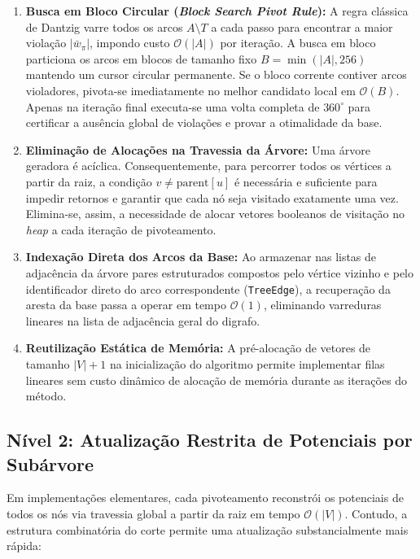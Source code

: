 \begin{enumerate}
    \item \textbf{Busca em Bloco Circular (\textit{Block Search Pivot Rule}):} A regra clássica de Dantzig varre todos os arcos $A \setminus T$ a cada passo para encontrar a maior violação $|\bar{w}_\pi|$, impondo custo $\mathcal{O}(|A|)$ por iteração. A busca em bloco particiona os arcos em blocos de tamanho fixo $B = \min(|A|, 256)$ mantendo um cursor circular permanente. Se o bloco corrente contiver arcos violadores, pivota-se imediatamente no melhor candidato local em $\mathcal{O}(B)$. Apenas na iteração final executa-se uma volta completa de $360^\circ$ para certificar a ausência global de violações e provar a otimalidade da base.
    \item \textbf{Eliminação de Alocações na Travessia da Árvore:} Uma árvore geradora é acíclica. Consequentemente, para percorrer todos os vértices a partir da raiz, a condição $v \ne \text{parent}[u]$ é necessária e suficiente para impedir retornos e garantir que cada nó seja visitado exatamente uma vez. Elimina-se, assim, a necessidade de alocar vetores booleanos de visitação no \textit{heap} a cada iteração de pivoteamento.
    \item \textbf{Indexação Direta dos Arcos da Base:} Ao armazenar nas listas de adjacência da árvore pares estruturados compostos pelo vértice vizinho e pelo identificador direto do arco correspondente (\lstinline{TreeEdge}), a recuperação da aresta da base passa a operar em tempo $\mathcal{O}(1)$, eliminando varreduras lineares na lista de adjacência geral do digrafo.
    \item \textbf{Reutilização Estática de Memória:} A pré-alocação de vetores de tamanho $|V|+1$ na inicialização do algoritmo permite implementar filas lineares sem custo dinâmico de alocação de memória durante as iterações do método.
\end{enumerate}

\subsection{Nível 2: Atualização Restrita de Potenciais por Subárvore}

Em implementações elementares, cada pivoteamento reconstrói os potenciais de todos os nós via travessia global a partir da raiz em tempo $\mathcal{O}(|V|)$. Contudo, a estrutura combinatória do corte permite uma atualização substancialmente mais rápida:

